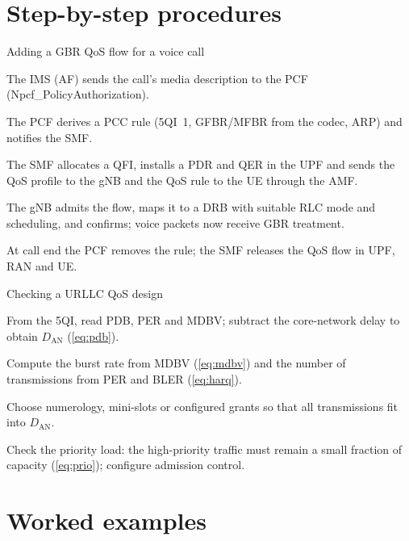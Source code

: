 \documentclass[11pt,a4paper]{article}
\begin{document}
\section{Step-by-step procedures}

\begin{procedurebox}{Adding a GBR QoS flow for a voice call}\label{proc:gbr}
\begin{steps}
  \item The IMS (AF) sends the call's media description to the PCF (Npcf\_PolicyAuthorization).
  \item The PCF derives a PCC rule (5QI~1, GFBR/MFBR from the codec, ARP) and notifies the SMF.
  \item The SMF allocates a QFI, installs a PDR and QER in the UPF and sends the QoS profile to the gNB and the QoS rule to the UE through the AMF.
  \item The gNB admits the flow, maps it to a DRB with suitable RLC mode and scheduling, and confirms; voice packets now receive GBR treatment.
  \item At call end the PCF removes the rule; the SMF releases the QoS flow in UPF, RAN and UE.
\end{steps}
\end{procedurebox}

\begin{procedurebox}{Checking a URLLC QoS design}\label{proc:urllc}
\begin{steps}
  \item From the 5QI, read PDB, PER and MDBV; subtract the core-network delay to obtain $D_{\mathrm{AN}}$ (\cref{eq:pdb}).
  \item Compute the burst rate from MDBV (\cref{eq:mdbv}) and the number of transmissions from PER and BLER (\cref{eq:harq}).
  \item Choose numerology, mini-slots or configured grants so that all transmissions fit into $D_{\mathrm{AN}}$.
  \item Check the priority load: the high-priority traffic must remain a small fraction of capacity (\cref{eq:prio}); configure admission control.
\end{steps}
\end{procedurebox}

\section{Worked examples}
\end{document}
